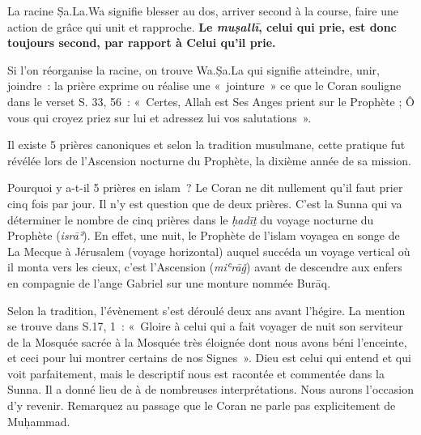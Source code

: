 

La racine Ṣa.La.Wa signifie blesser au dos, arriver second à la course,
faire une action de grâce qui unit et rapproche. \textbf{Le
\emph{muṣallī}, celui qui prie, est donc toujours second, par rapport à
Celui qu'il prie.}

Si l'on réorganise la racine, on trouve Wa.Ṣa.La qui signifie atteindre,
unir, joindre~: la prière exprime ou réalise une «~jointure~» ce que le
Coran souligne dans le verset S. 33, 56~: «~Certes, Allah est Ses Anges
prient sur le Prophète ; Ô vous qui croyez priez sur lui et adressez lui
vos salutations~».


Il existe 5 prières canoniques et selon la tradition musulmane, cette
pratique fut révélée lors de l'Ascension nocturne du Prophète, la
dixième année de sa mission.


Pourquoi y a-t-il 5 prières en islam~? Le Coran ne dit nullement qu'il
faut prier cinq fois par jour. Il n'y est question que de deux prières.
C'est la Sunna qui va déterminer le nombre de cinq prières dans le
\emph{ḥadīṯ} du voyage nocturne du Prophète (\emph{isrāʾ}). En effet,
une nuit, le Prophète de l'islam voyagea en songe de La Mecque à
Jérusalem (voyage horizontal) auquel succéda un voyage vertical où il
monta vers les cieux, c'est l'Ascension (\emph{miʿrāǧ}) avant de
descendre aux enfers en compagnie de l'ange Gabriel sur une monture
nommée Burāq.

Selon la tradition, l'évènement s'est déroulé deux ans avant l'hégire.
La mention se trouve dans S.17, 1~: «~Gloire à celui qui a fait voyager
de nuit son serviteur de la Mosquée sacrée à la Mosquée très éloignée
dont nous avons béni l'enceinte, et ceci pour lui montrer certains de
nos Signes~». Dieu est celui qui entend et qui voit parfaitement, mais
le descriptif nous est racontée et commentée dans la Sunna. Il a donné
lieu de à de nombreuses interprétations. Nous aurons l'occasion d'y
revenir. Remarquez au passage que le Coran ne parle pas explicitement de
Muḥammad.

